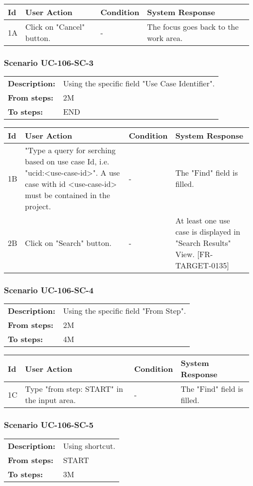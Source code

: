 \documentclass[a4paper,11pt]{article}
\newcommand{\bl}{\\ \hline}
\begin{document}
\begin{tabular}{|p{0.8in}|p{1.6in}|p{1.6in}|p{1.6in}|}
\hline
Id & User Action & Condition & System Response  \bl 
1A & Click on "Cancel" button. & - & The focus goes back to the work area. \bl 
\end{tabular}
\subsubsection*{Scenario UC-106-SC-3}
\begin{tabular}{p{1in}p{4in}}
{\bf Description:} & Using the specific field "Use Case Identifier". \\
{\bf From steps:} & 2M \\
{\bf To steps:} & END \\
\end{tabular}
 
\begin{tabular}{|p{0.8in}|p{1.6in}|p{1.6in}|p{1.6in}|}
\hline
Id & User Action & Condition & System Response  \bl 
1B & "Type a query for serching based on use case Id, i.e. "ucid:<use-case-id>". A use case with id <use-case-id> must be contained in the project. & - & The "Find" field is filled. \bl 
2B & Click on "Search" button. & - & At least one use case is displayed in "Search Results" View.  [FR-TARGET-0135] \bl 
\end{tabular}
\subsubsection*{Scenario UC-106-SC-4}
\begin{tabular}{p{1in}p{4in}}
{\bf Description:} & Using the specific field "From Step". \\
{\bf From steps:} & 2M \\
{\bf To steps:} & 4M \\
\end{tabular}
 
\begin{tabular}{|p{0.8in}|p{1.6in}|p{1.6in}|p{1.6in}|}
\hline
Id & User Action & Condition & System Response  \bl 
1C & Type "from step: START" in the input area. & - & The "Find" field is filled. \bl 
\end{tabular}
\subsubsection*{Scenario UC-106-SC-5}
\begin{tabular}{p{1in}p{4in}}
{\bf Description:} & Using shortcut. \\
{\bf From steps:} & START \\
{\bf To steps:} & 3M \\
\end{tabular}
 
\end{document}
